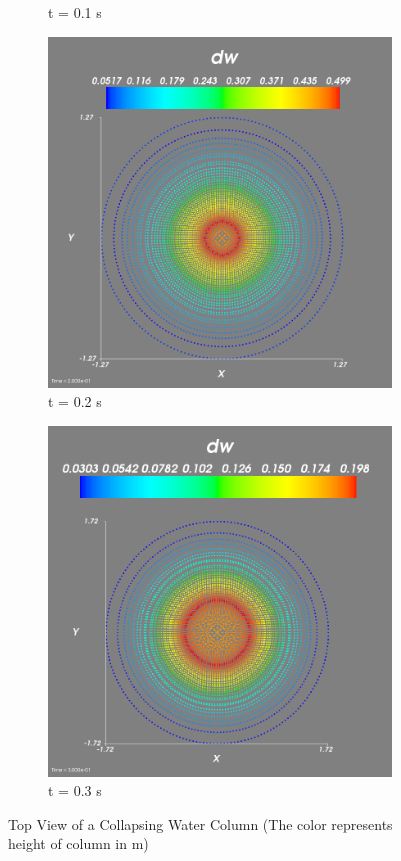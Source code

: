 \documentclass{article}
\begin{document}
\begin{figure}[!htbp]
\begin{subfigure}{.5\textwidth}
  \caption{t = 0.1 s}
  \label{fig:su2}
\end{subfigure}
\begin{subfigure}{.5\textwidth}
  \centering
  \includegraphics[width=1.1\linewidth]{width_t2.png}
  \caption{t = 0.2 s}
  \label{fig:su3}
\end{subfigure}%
\begin{subfigure}{.5\textwidth}
  \centering
  \includegraphics[width=1.1\linewidth]{width_t3.png}
  \caption{t = 0.3 s}
  \label{fig:su4}
\end{subfigure}
\caption{Top View of a Collapsing Water Column (The color represents height of column in m)}
\label{fig:topcollapse}
\end{figure}
\newpage
\end{document}

